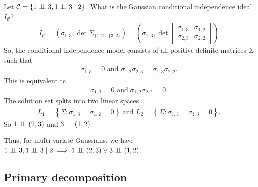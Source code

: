 \begin{eg}
  Let \( \mathcal{C} = \left\{ 1 \perp \!\!\! \perp 3, 1 \perp \!\!\! \perp 3 \mid 2 \right\} \). What is the Gaussian conditional independence ideal \( I_{\mathcal{C}} \)?
  \begin{align*}
    I_{\mathcal{C}} = (\sigma_{1,3}, \det \Sigma_{\{1,2\}, \{ 3,2\}}) = (\sigma_{1,3}, \det \begin{bmatrix}
      \sigma_{1,3} & \sigma_{1,2} \\ \sigma_{2,3} & \sigma_{2,2}
    \end{bmatrix})
  \end{align*}
  So, the conditional independence model consists of all positive definite matrices \( \Sigma \) such that 
  \begin{align*}
    \sigma_{1,3} = 0 \text{ and } \sigma_{1,2} \sigma_{2,3} = \sigma_{1,3} \sigma_{2,2}.
  \end{align*}
  This is equivalent to 
  \begin{align*}
    \sigma_{1,3} = 0 \text{ and } \sigma_{1,2} \sigma_{2,3}  = 0.
  \end{align*}
  The solution set splits into two linear spaces 
  \begin{align*}
    L_1 = \left\{ \Sigma : \sigma_{1,3} = \sigma_{1,2} = 0  \right\} \text{ and } L_2 = \left\{ \Sigma : \sigma_{1,3} = \sigma_{2,3} = 0  \right\}.
  \end{align*}
  So \( 1 \perp \!\!\! \perp (2,3) \) and \( 3 \perp \!\!\! \perp (1,2)  \).

  Thus, for multi-variate Gaussians, we have \( 1 \indep 3, 1 \indep 3 \mid 2 \implies 1 \indep (2,3) \lor 3 \indep (1,2) \).
\end{eg}


\subsection{Primary decomposition}

